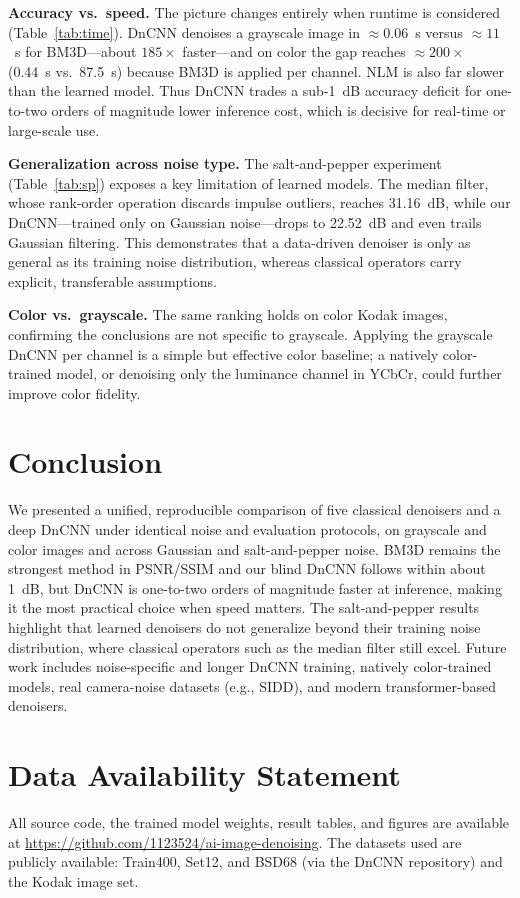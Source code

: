 \documentclass[conference]{IEEEtran}
\begin{document}
\textbf{Accuracy vs.\ speed.} The picture changes entirely when runtime is
considered (Table~\ref{tab:time}). DnCNN denoises a grayscale image in
$\approx0.06$~s versus $\approx11$~s for BM3D---about $185\times$ faster---and on
color the gap reaches $\approx200\times$ (0.44~s vs.\ 87.5~s) because BM3D is
applied per channel. NLM is also far slower than the learned model. Thus DnCNN
trades a sub-1~dB accuracy deficit for one-to-two orders of magnitude lower
inference cost, which is decisive for real-time or large-scale use.

\textbf{Generalization across noise type.} The salt-and-pepper experiment
(Table~\ref{tab:sp}) exposes a key limitation of learned models. The median
filter, whose rank-order operation discards impulse outliers, reaches 31.16~dB,
while our DnCNN---trained only on Gaussian noise---drops to 22.52~dB and even
trails Gaussian filtering. This demonstrates that a data-driven denoiser is only
as general as its training noise distribution, whereas classical operators carry
explicit, transferable assumptions.

\textbf{Color vs.\ grayscale.} The same ranking holds on color Kodak images,
confirming the conclusions are not specific to grayscale. Applying the grayscale
DnCNN per channel is a simple but effective color baseline; a natively
color-trained model, or denoising only the luminance channel in YCbCr, could
further improve color fidelity.

\section{Conclusion}\label{sec:conc}
We presented a unified, reproducible comparison of five classical denoisers and a
deep DnCNN under identical noise and evaluation protocols, on grayscale and color
images and across Gaussian and salt-and-pepper noise. BM3D remains the strongest
method in PSNR/SSIM and our blind DnCNN follows within about 1~dB, but DnCNN is
one-to-two orders of magnitude faster at inference, making it the most practical
choice when speed matters. The salt-and-pepper results highlight that learned
denoisers do not generalize beyond their training noise distribution, where
classical operators such as the median filter still excel. Future work includes
noise-specific and longer DnCNN training, natively color-trained models, real
camera-noise datasets (e.g., SIDD), and modern transformer-based denoisers.

\section*{Data Availability Statement}
All source code, the trained model weights, result tables, and figures are
available at \url{https://github.com/1123524/ai-image-denoising}. The datasets
used are publicly available: Train400, Set12, and BSD68 (via the DnCNN
repository) and the Kodak image set.



\end{document}
